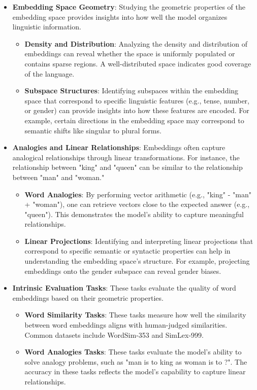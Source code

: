 \begin{itemize}
    \item \textbf{Embedding Space Geometry}: Studying the geometric properties of the embedding space provides insights into how well the model organizes linguistic information.
    \begin{itemize}
        \item \textbf{Density and Distribution}: Analyzing the density and distribution of embeddings can reveal whether the space is uniformly populated or contains sparse regions. A well-distributed space indicates good coverage of the language.
        \item \textbf{Subspace Structures}: Identifying subspaces within the embedding space that correspond to specific linguistic features (e.g., tense, number, or gender) can provide insights into how these features are encoded. For example, certain directions in the embedding space may correspond to semantic shifts like singular to plural forms.
    \end{itemize}

    \item \textbf{Analogies and Linear Relationships}: Embeddings often capture analogical relationships through linear transformations. For instance, the relationship between "king" and "queen" can be similar to the relationship between "man" and "woman."
    \begin{itemize}
        \item \textbf{Word Analogies}: By performing vector arithmetic (e.g., "king" - "man" + "woman"), one can retrieve vectors close to the expected answer (e.g., "queen"). This demonstrates the model's ability to capture meaningful relationships.
        \item \textbf{Linear Projections}: Identifying and interpreting linear projections that correspond to specific semantic or syntactic properties can help in understanding the embedding space's structure. For example, projecting embeddings onto the gender subspace can reveal gender biases.
    \end{itemize}
    
    \item \textbf{Intrinsic Evaluation Tasks}: These tasks evaluate the quality of word embeddings based on their geometric properties.
    \begin{itemize}
        \item \textbf{Word Similarity Tasks}: These tasks measure how well the similarity between word embeddings aligns with human-judged similarities. Common datasets include WordSim-353 and SimLex-999.
        \item \textbf{Word Analogies Tasks}: These tasks evaluate the model's ability to solve analogy problems, such as "man is to king as woman is to ?". The accuracy in these tasks reflects the model's capability to capture linear relationships.
    \end{itemize}
    
\end{itemize}

